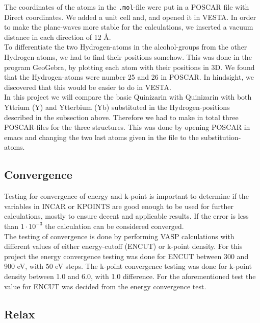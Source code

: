 \documentclass{article}
\begin{document}
  The coordinates of the atoms in the \texttt{.mol}-file were put in a POSCAR file with Direct coordinates. We added a unit cell and, and opened it in VESTA. In order to make the plane-waves more stable for the calculations, we inserted a vacuum distance in each direction of 12 Å. \\

  To differentiate the two Hydrogen-atoms in the alcohol-groups from the other Hydrogen-atoms, we had to find their positions somehow. This was done in the program GeoGebra, by plotting each atom with their positions in 3D. We found that the Hydrogen-atoms were number 25 and 26 in POSCAR. In hindsight, we discovered that this would be easier to do in VESTA. \\

  In this project we will compare the basic Quinizarin with Quinizarin with both Yttrium (Y) and Ytterbium (Yb) substituted in the Hydrogen-positions described in the subsection above. Therefore we had to make in total three POSCAR-files for the three structures. This was done by opening POSCAR in emacs and changing the two last atoms given in the file to the substitution-atoms. \\


  \subsection{Convergence}  \label{sec:Convergence}

    Testing for convergence of energy and k-point is important to determine if the variables in INCAR or KPOINTS are good enough to be used for further calculations, mostly to ensure decent and applicable results. If the error is less than $1\cdot 10^{-3}$ the calculation can be considered converged. \\

    The testing of convergence is done by performing VASP calculations with different values of either energy-cutoff (ENCUT) or k-point density. For this project the energy convergence testing was done for ENCUT between 300 and 900 eV, with 50 eV steps. The k-point convergence testing was done for k-point density between 1.0 and 6.0, with 1.0 difference. For the aforementioned test the value for ENCUT was decided from the energy convergence test. \\


  \subsection{Relax}
\end{document}
